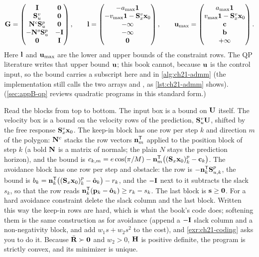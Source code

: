 \begin{equation}
\mathbf{G}=\begin{pmatrix}\mathbf{I}&\mathbf{0}\\ \mathbf{S}_u^{v}&\mathbf{0}\\ \mathbf{N}^{c}\mathbf{S}_u^{p}&\mathbf{0}\\ -\mathbf{N}^{o}\mathbf{S}_u^{p}&-\mathbf{I}\\ \mathbf{0}&\mathbf{I}\end{pmatrix},\qquad
\mathbf{l}=\begin{pmatrix}-a_{\max}\mathbf{1}\\ -v_{\max}\mathbf{1}-\mathbf{S}_x^{v}\mathbf{x}_0\\ -\infty\\ -\infty\\ \mathbf{0}\end{pmatrix},\qquad
\mathbf{u}_{\max}=\begin{pmatrix}a_{\max}\mathbf{1}\\ v_{\max}\mathbf{1}-\mathbf{S}_x^{v}\mathbf{x}_0\\ \mathbf{c}\\ \mathbf{b}\\ +\infty\end{pmatrix}.
\label{eq:ch21-qp-constraints}
\end{equation}
Here $\mathbf{l}$ and $\mathbf{u}_{\max}$ are the lower and upper bounds of the
constraint rows. The QP literature writes that upper bound $\mathbf{u}$; this
book cannot, because $\mathbf{u}$ is the control input, so the bound carries a
subscript here and in \cref{alg:ch21-admm} (the implementation still calls the
two arrays  and , as \cref{lst:ch21-admm} shows).
(\cref{sec:appB-qp} reviews quadratic programs in this standard form.)

Read the blocks from top to bottom. The input box is a bound on $\mathbf{U}$
itself. The velocity box is a bound on the velocity rows of the prediction,
$\mathbf{S}_u^{v}\mathbf{U}$, shifted by the free response $\mathbf{S}_x^{v}\mathbf{x}_0$.
The keep-in block has one row per step $k$ and direction $m$ of the polygon:
$\mathbf{N}^{c}$ stacks the row vectors $\mathbf{n}_m^{\mathsf{T}}$ applied to the position
block of step $k$ (a bold $\mathbf{N}$ is a matrix of normals; the plain $N$
stays the prediction horizon), and the bound is
$c_{k,m}=e\cos(\pi/M)-\mathbf{n}_m^{\mathsf{T}}\bigl((\mathbf{S}_x\mathbf{x}_0)^{p}_k-\mathbf{c}_k\bigr)$.
The avoidance block has one row per step and obstacle: the row is
$-\mathbf{n}_k^{\mathsf{T}}\mathbf{S}_{u,k}^{p}$, the bound is
$b_k=\mathbf{n}_k^{\mathsf{T}}\bigl((\mathbf{S}_x\mathbf{x}_0)^{p}_k-\hat{\mathbf{o}}_k\bigr)-r_k$,
and the $-\mathbf{I}$ next to it subtracts the slack $s_k$, so that the row
reads $\mathbf{n}_k^{\mathsf{T}}(\mathbf{p}_k-\hat{\mathbf{o}}_k)\ge r_k-s_k$. The last block is
$\mathbf{s}\ge\mathbf{0}$. For a hard avoidance constraint delete the slack
column and the last block. Written this way the keep-in rows are hard, which
is what the book's code does; softening them is the same construction as for
avoidance (append a $-\mathbf{I}$ slack column and a non-negativity block, and add
$w_1s+w_2s^2$ to the cost), and \cref{exr:ch21-coding} asks you to do it. Because $\bar{\mathbf{R}}\succ\mathbf{0}$ and $w_2>0$,
$\mathbf{H}$ is positive definite, the program is strictly convex, and its
minimizer is unique.

